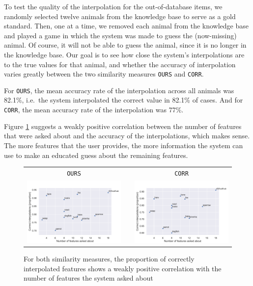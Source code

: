 \documentclass[11pt,a4paper]{article}
\begin{document}
To test the quality of the interpolation for the out-of-database items, we randomly selected twelve animals from the knowledge base to serve as a gold standard.
Then, one at a time, we removed each animal from the knowledge base and played a game in which the system was made to guess the (now-missing) animal. 
Of course, it will not be able to guess the animal, since it is no longer in the knowledge base.
Our goal is to see how close the system's interpolations are to the true values for that animal, and whether the accuracy of interpolation varies greatly between the two similarity measures \texttt{OURS} and \texttt{CORR}.

For \texttt{OURS}, the mean accuracy rate of the interpolation across all animals was 82.1\%, i.e.\ the system interpolated the correct value in 82.1\% of cases.
And for \texttt{CORR}, the mean accuracy rate of the interpolation was 77\%.

Figure \ref{fig:interp-eval} suggests a weakly positive correlation between the number of features that were asked about and the accuracy of the interpolations, which makes sense.
The more features that the user provides, the more information the system can use to make an educated guess about the remaining features.


\begin{figure}
\centering
\begin{tabular}{@{}ccc}
\texttt{OURS} && \texttt{CORR} \\
\includegraphics[trim=0 0 0 30,clip,width=.48\linewidth]{graphics/interpolation-eval-ours.pdf} && 
\includegraphics[trim=0 0 0 30,clip,width=.48\linewidth]{graphics/interpolation-eval-corr.pdf} \\
\end{tabular}
	\caption{For both similarity measures, the proportion of correctly interpolated features shows a weakly positive correlation with the number of features the system asked about}
	\label{fig:interp-eval}
\end{figure}
\end{document}
